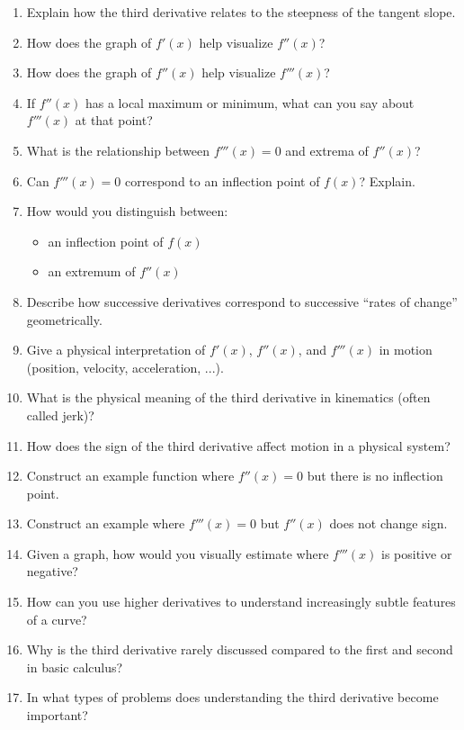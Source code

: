 \begin{enumerate}
\item Explain how the third derivative relates to the steepness of the tangent slope.

\item How does the graph of $f'(x)$ help visualize $f''(x)$?

\item How does the graph of $f''(x)$ help visualize $f'''(x)$?

\item If $f''(x)$ has a local maximum or minimum, what can you say about $f'''(x)$ at that point?

\item What is the relationship between $f'''(x)=0$ and extrema of $f''(x)$?

\item Can $f'''(x)=0$ correspond to an inflection point of $f(x)$? Explain.

\item How would you distinguish between:
  \begin{itemize}
    \item an inflection point of $f(x)$
    \item an extremum of $f''(x)$
  \end{itemize}

\item Describe how successive derivatives correspond to successive “rates of change” geometrically.

\item Give a physical interpretation of $f'(x)$, $f''(x)$, and $f'''(x)$ in motion (position, velocity, acceleration, ...).

\item What is the physical meaning of the third derivative in kinematics (often called jerk)?

\item How does the sign of the third derivative affect motion in a physical system?

\item Construct an example function where $f''(x)=0$ but there is no inflection point.

\item Construct an example where $f'''(x)=0$ but $f''(x)$ does not change sign.

\item Given a graph, how would you visually estimate where $f'''(x)$ is positive or negative?

\item How can you use higher derivatives to understand increasingly subtle features of a curve?

\item Why is the third derivative rarely discussed compared to the first and second in basic calculus?

\item In what types of problems does understanding the third derivative become important?

\end{enumerate}
